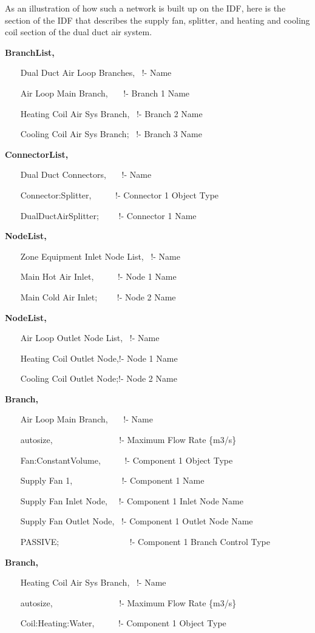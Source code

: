 As an illustration of how such a network is built up on the IDF, here is the section of the IDF that describes the supply fan, splitter, and heating and cooling coil section of the dual duct air system.

\textbf{BranchList,}

~~~ Dual Duct Air Loop Branches,~ !- Name

~~~ Air Loop Main Branch,~~~ !- Branch 1 Name

~~~ Heating Coil Air Sys Branch,~ !- Branch 2 Name

~~~ Cooling Coil Air Sys Branch;~ !- Branch 3 Name

\textbf{ConnectorList,}

~~~ Dual Duct Connectors,~~~ !- Name

~~~ Connector:Splitter,~~~~~ !- Connector 1 Object Type

~~~ DualDuctAirSplitter;~~~~ !- Connector 1 Name

\textbf{NodeList,}

~~~ Zone Equipment Inlet Node List,~ !- Name

~~~ Main Hot Air Inlet,~~~~~ !- Node 1 Name

~~~ Main Cold Air Inlet;~~~~ !- Node 2 Name

\textbf{NodeList,}

~~~ Air Loop Outlet Node List,~ !- Name

~~~ Heating Coil Outlet Node,!- Node 1 Name

~~~ Cooling Coil Outlet Node;!- Node 2 Name

\textbf{Branch,}

~~~ Air Loop Main Branch,~~~ !- Name

~~~ autosize,~~~~~~~~~~~~~~~ !- Maximum Flow Rate \{m3/s\}

~~~ Fan:ConstantVolume,~~~~~ !- Component 1 Object Type

~~~ Supply Fan 1,~~~~~~~~~~~ !- Component 1 Name

~~~ Supply Fan Inlet Node,~~ !- Component 1 Inlet Node Name

~~~ Supply Fan Outlet Node,~ !- Component 1 Outlet Node Name

~~~ PASSIVE;~~~~~~~~~~~~~~~~ !- Component 1 Branch Control Type

\textbf{Branch,}

~~~ Heating Coil Air Sys Branch,~ !- Name

~~~ autosize,~~~~~~~~~~~~~~~ !- Maximum Flow Rate \{m3/s\}

~~~ Coil:Heating:Water,~~~~~ !- Component 1 Object Type

